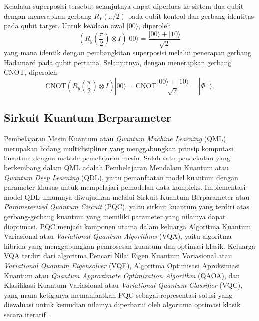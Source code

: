 Keadaan superposisi tersebut selanjutnya dapat diperluas ke sistem dua qubit dengan menerapkan gerbang $R_Y (\pi/2)$ pada qubit kontrol dan gerbang identitas pada qubit target. Untuk keadaan awal $|00\rangle$, diperoleh
\begin{equation}
    \label{eq:hadamard_rotation}
    \left( R_y \left(\frac{\pi}{2}\right) \otimes I \right) |00\rangle = \frac{|00\rangle + |10\rangle}{\sqrt{2}}
\end{equation}
yang mana identik dengan pembangkitan superposisi melalui penerapan gerbang Hadamard pada qubit pertama. Selanjutnya, dengan menerapkan gerbang CNOT, diperoleh
\begin{equation}
    \label{eq:hadamard_rotation}
    \text{CNOT} \left( R_y \left(\frac{\pi}{2}\right) \otimes I \right) |00\rangle = \text{CNOT} \frac{|00\rangle + |10\rangle}{\sqrt{2}} = |\Phi^+\rangle.
\end{equation}

\subsection{Sirkuit Kuantum Berparameter}
Pembelajaran Mesin Kuantum atau \textit{Quantum Machine Learning} (QML) merupakan bidang multidisipliner yang menggabungkan prinsip komputasi kuantum dengan metode pemelajaran mesin. Salah satu pendekatan yang berkembang dalam QML adalah Pembelajaran Mendalam Kuantum atau \textit{Quantum Deep Learning} (QDL), yaitu pemanfaatan model kuantum dengan parameter khusus untuk mempelajari pemodelan data kompleks. Implementasi model QDL umumnya diwujudkan melalui Sirkuit Kuantum Berparameter atau \textit{Parameterized Quantum Circuit} (PQC), yaitu sirkuit kuantum yang terdiri atas gerbang-gerbang kuantum yang memiliki parameter yang nilainya dapat dioptimasi. PQC menjadi komponen utama dalam keluarga Algoritma Kuantum Variasional atau \textit{Variational Quantum Algorithms} (VQA), yaitu algoritma hibrida yang menggabungkan pemrosesan kuantum dan optimasi klasik. Keluarga VQA terdiri dari algoritma Pencari Nilai Eigen Kuantum Variasional atau \textit{Variational Quantum Eigensolver} (VQE), Algoritma Optimisasi Aproksimasi Kuantum atau \textit{Quantum Approximate Optimization Algorithm} (QAOA), dan Klasifikasi Kuantum Variasional atau \textit{Variational Quantum Classifier} (VQC), yang mana ketiganya memanfaatkan PQC sebagai representasi solusi yang dievaluasi untuk kemudian nilainya diperbarui oleh algoritma optimasi klasik secara iteratif~.

